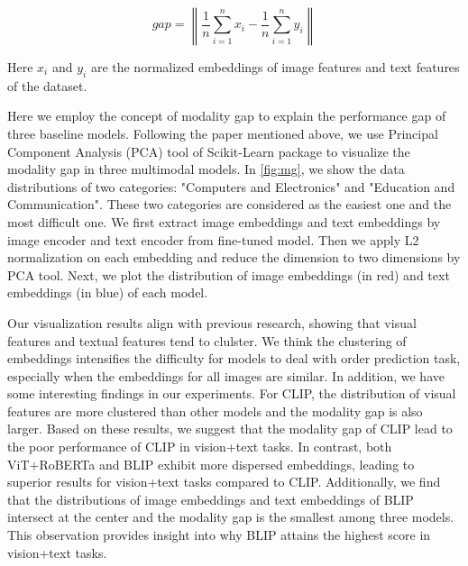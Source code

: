 \documentclass[11pt]{article}
\begin{document}
\begin{equation}
    gap=\left \lVert \frac{1}{n}\sum_{i=1}^n x_i - \frac{1}{n}\sum_{i=1}^n y_i \right \rVert
\end{equation}

Here $x_i$ and $y_i$ are the normalized embeddings of image features and text features of the dataset.

Here we employ the concept of modality gap to explain the performance gap of three baseline models. Following the paper mentioned above, we use Principal Component Analysis (PCA) tool of Scikit-Learn package to visualize the modality gap in three multimodal models. In \autoref{fig:mg}, we show the data distributions of two categories: "Computers and Electronics" and "Education and Communication". These two categories are considered as the easiest one and the most difficult one. We first extract image embeddings and text embeddings by image encoder and text encoder from fine-tuned model. Then we apply L2 normalization on each embedding and reduce the dimension to two dimensions by PCA tool. Next, we plot the distribution of image embeddings (in red) and text embeddings (in blue) of each model. 

Our visualization results align with previous research, showing that visual features and textual features tend to clulster. We think the clustering of embeddings intensifies the difficulty for models to deal with order prediction task, especially when the embeddings for all images are similar. In addition, we have some interesting findings in our experiments. For CLIP, the distribution of visual features are more clustered than other models and the modality gap is also larger. Based on these results, we suggest that the modality gap of CLIP lead to the poor performance of CLIP in vision+text tasks. In contrast, both ViT+RoBERTa and BLIP exhibit more dispersed embeddings, leading to superior results for vision+text tasks compared to CLIP. Additionally, we find that the distributions of image embeddings and text embeddings of BLIP intersect at the center and the modality gap is the smallest among three models. This observation provides insight into why BLIP attains the highest score in vision+text tasks.
\end{document}
